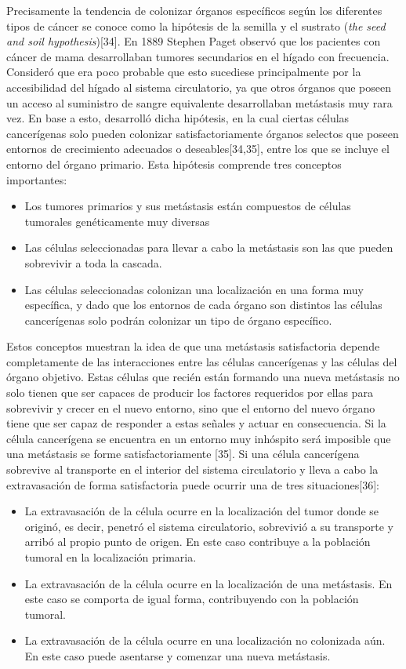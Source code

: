 \hspace{.1cm}Precisamente la tendencia de colonizar órganos específicos según los diferentes tipos de cáncer se conoce como la hipótesis de la semilla y el sustrato (\textit{the seed and soil hypothesis})[34]. En 1889 Stephen Paget observó que los pacientes con cáncer de mama desarrollaban tumores secundarios en el hígado con frecuencia. Consideró que era poco probable que esto sucediese principalmente por la accesibilidad del hígado al sistema circulatorio, ya que otros órganos que poseen un acceso al suministro de sangre equivalente desarrollaban metástasis muy rara vez. En base a esto, desarrolló dicha hipótesis, en la cual ciertas células cancerígenas solo pueden colonizar satisfactoriamente órganos selectos que poseen entornos de crecimiento adecuados o deseables[34,35], entre los que se incluye el entorno del órgano primario. Esta hipótesis comprende tres conceptos importantes:
\begin{itemize}
    \item Los tumores primarios y sus metástasis están compuestos de células tumorales genéticamente muy diversas
    \item Las células seleccionadas para llevar a cabo la metástasis son las que pueden sobrevivir a toda la cascada.
    \item Las células seleccionadas colonizan una localización en una forma muy específica, y dado que los entornos de cada órgano son distintos las células cancerígenas solo podrán colonizar un tipo de órgano específico.
\end{itemize}
Estos conceptos muestran la idea de que una metástasis satisfactoria depende completamente de las interacciones entre las células cancerígenas y las células del órgano objetivo. Estas células que recién están formando una nueva metástasis no solo tienen que ser capaces de producir los factores requeridos por ellas para sobrevivir y crecer en el nuevo entorno, sino que el entorno del nuevo órgano tiene que ser capaz de responder a estas señales y actuar en consecuencia. Si la célula cancerígena se encuentra en un entorno muy inhóspito será imposible que una metástasis se forme satisfactoriamente [35]. Si una célula cancerígena sobrevive al transporte en el interior del sistema circulatorio y lleva a cabo la extravasación de forma satisfactoria puede ocurrir una de tres situaciones[36]:
\begin{itemize}
    \item La extravasación de la célula ocurre en la localización del tumor donde se originó, es decir, penetró el sistema circulatorio, sobrevivió a su transporte y arribó al propio punto de origen. En este caso contribuye a la población tumoral en la localización primaria.
    \item La extravasación de la célula ocurre en la localización de una metástasis. En este caso se comporta de igual forma, contribuyendo con la población tumoral.
    \item La extravasación de la célula ocurre en una localización no colonizada aún. En este caso puede asentarse y comenzar una nueva metástasis.
\end{itemize}